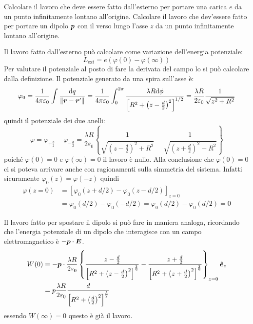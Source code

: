 \begin{Es}
  Calcolare il lavoro che deve essere fatto dall'esterno per portare una carica $e$ da un punto infinitamente lontano all'origine. Calcolare il lavoro che dev'essere fatto per portare un dipolo $\boldsymbol{p}$ con il verso lungo l'asse $z$ da un punto infinitamente lontano all'origine.

  Il lavoro fatto dall'esterno può calcolare come variazione dell'energia potenziale:
  \[
    L_\text{ext} = e(\varphi(0)-\varphi(\infty))
  \]
  Per valutare il potenziale al posto di fare la derivata del campo lo si può calcolare dalla definizione. Il potenziale generato da una spira sull'asse è:
  \[
    \varphi_0 = \frac{1}{4\pi\varepsilon_0}\int\frac{\mathrm{d} q}{\left\lVert\boldsymbol{r} - \boldsymbol{r}'\right\rVert} = \frac{1}{4\pi\varepsilon_0}\int_0^{2\pi}\frac{\lambda R\mathrm{d}\phi}{\left[R^2+\left(z-\frac{d}{2}\right)^2\right]^{1/2}}=\frac{\lambda R}{2\varepsilon_0}\frac{1}{\sqrt{z^2+R^2}}
  \]
  quindi il potenziale dei due anelli:
  \[
    \varphi = \varphi_{+\frac{d}{2}} - \varphi_{-\frac{d}{2}} = \frac{\lambda R}{2\varepsilon_0}\left\{\frac{1}{\sqrt{\left(z-\frac{d}{2}\right)^2+R^2}}-\frac{1}{\sqrt{\left(z+\frac{d}{2}\right)^2+R^2}}\right\}
  \]
  poiché $\varphi(0)=0$ e $\varphi(\infty)=0$ il lavoro è nullo. Alla conclusione che $\varphi(0)=0$ ci si poteva arrivare anche con ragionamenti sulla simmetria del sistema. Infatti sicuramente $\varphi_0(z) = \varphi(-z)$ quindi
  \[
    \begin{aligned}
      \varphi(z=0) & = \left[\varphi_0(z+d/2)-\varphi_0(z-d/2)\right]_{z=0}               \\
                   & = \varphi_0(d/2)-\varphi_0(-d/2) = \varphi_0(d/2)-\varphi_0(d/2) = 0
    \end{aligned}
  \]


  Il lavoro fatto per spostare il dipolo si può fare in maniera analoga, ricordando che l'energia potenziale di un dipolo che interagisce con un campo elettromagnetico è $-\boldsymbol{p}\cdot \boldsymbol{E}$.
  \begin{align*}
    W(0) & = -\boldsymbol{p}\cdot \frac{\lambda R}{2\varepsilon_0}\left\{
    \frac{z-\frac{d}{2}}{\left[R^2+\left(z-\frac{d}{2}\right)^2\right]^{\frac{3}{2}}}
    -\frac{z+\frac{d}{2}}{\left[R^2+\left(z+\frac{d}{2}\right)^2\right]^{\frac{3}{2}}}\right\}_{z=0}\boldsymbol{\hat {e}}_z \\
         & = p\frac{\lambda R}{2\varepsilon_0}
    \frac{d}{\left[R^2+\left(\frac{d}{2}\right)^2\right]^{\frac{3}{2}}}
  \end{align*}
  essendo $W(\infty)=0$ questo è già il lavoro.
\end{Es}



